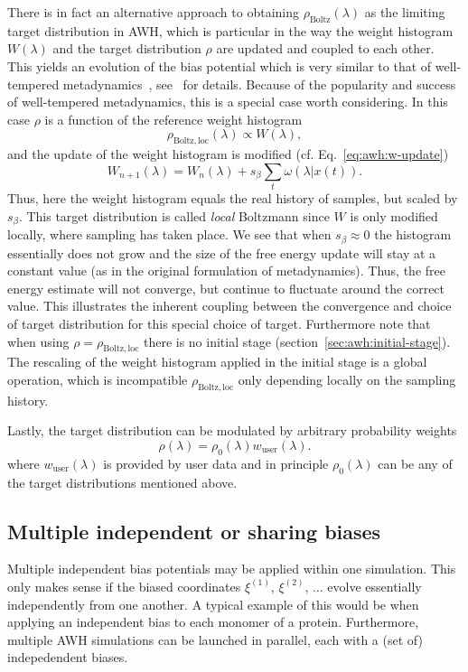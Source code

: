 There is in fact an alternative approach to obtaining $\rho_{\mathrm{Boltz}}(\lambda)$ as the limiting target distribution in AWH,
which is particular in the way the  weight histogram $W(\lambda)$ and the target distribution $\rho$ are updated and coupled to each other.
This yields an evolution of the bias potential which is very similar to that of well-tempered metadynamics~\cite{barducci2008well}, 
see~\cite{lindahl2014accelerated} for details.
Because of the popularity and success of well-tempered metadynamics, this is a special case worth considering.
In this case $\rho$ is a function of the reference weight histogram
\begin{equation}
\rho_{\mathrm{Boltz,loc}}(\lambda) \propto W(\lambda), %
\end{equation}
and the update of the weight histogram is modified (cf. Eq.~\ref{eq:awh:w-update}) 
\begin{equation}
 W_{n+1}(\lambda) =  W_{n}(\lambda) + s_{\beta}\sum_t \omega(\lambda|x(t)).
\end{equation}
Thus, here the weight histogram equals the real history of samples, but scaled by $s_\beta$.
This target distribution is called \emph{local} Boltzmann since $W$ is only modified locally, where sampling has taken place.
We see that when $s_\beta \approx 0$ the histogram  essentially does not grow
and the size of the free energy update will stay at a constant value 
(as in the original formulation of metadynamics).
Thus, the free energy estimate will not converge, but continue to fluctuate around the correct value.
This illustrates the inherent coupling 
between the convergence and choice of target distribution for this special choice of target.
Furthermore note that when using $\rho=\rho_{\mathrm{Boltz,loc}}$ there is no initial stage (section~\ref{sec:awh:initial-stage}).
The rescaling of the weight histogram applied in the initial stage is a global operation,
which is incompatible $\rho_{\mathrm{Boltz,loc}}$ only depending locally on the sampling history.

Lastly, the target distribution can be modulated by arbitrary probability weights
\begin{equation}
\rho(\lambda) = \rho_0(\lambda) w_{\mathrm{user}}(\lambda).
\end{equation}
where  $w_{\mathrm{user}}(\lambda)$ is provided  by user data and in principle $\rho_0(\lambda)$ can
be any of the target distributions mentioned above.
 
\subsection{Multiple independent or sharing biases}
Multiple independent bias potentials may be applied within one simulation. 
This only makes sense if the biased coordinates $\xi^{(1)}$, $\xi^{(2)}$, $\ldots$ evolve essentially independently from one another.
A typical example of this would be when applying an independent bias to each monomer of a protein.
Furthermore, multiple AWH simulations can be launched in parallel, each with a (set of) indepedendent biases.

